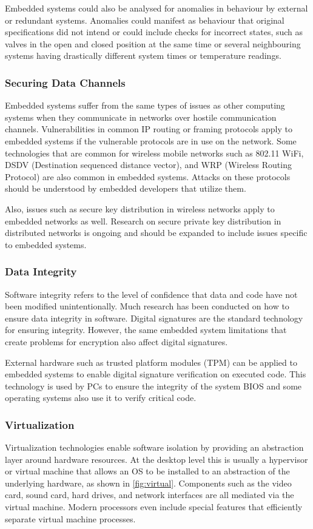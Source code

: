 \documentclass[final,conference,11pt]{IEEEtran}
\begin{document}
Embedded systems could also be analysed for anomalies in behaviour by external or redundant systems.  Anomalies could manifest as behaviour that original specifications did not intend or could include checks for incorrect states, such as valves in the open and closed position at the same time or several neighbouring systems having drastically different system times or temperature readings. \cite{Bondavalli2013} 

\subsubsection{Securing Data Channels}
Embedded systems suffer from the same types of issues as other computing systems when they communicate in networks over hostile communication channels.  Vulnerabilities in common IP routing or framing protocols apply to embedded systems if the vulnerable protocols are in use on the network.  Some technologies that are common for wireless mobile networks such as 802.11 WiFi, DSDV (Destination sequenced distance vector), and WRP (Wireless Routing Protocol) are also common in embedded systems. Attacks on these protocols should be understood by embedded developers that utilize them.  \cite{Kotha2012,edselc.2-52.0-7995199368320100101}

Also, issues such as secure key distribution in wireless networks apply to embedded networks as well.  Research on secure private key distribution in distributed networks is ongoing and should be expanded to include issues specific to embedded systems.

\subsubsection{Data Integrity}
Software integrity refers to the level of confidence that data and code have not been modified unintentionally.  Much research has been conducted on how to ensure data integrity in software.  Digital signatures are the standard technology for ensuring integrity. However, the same embedded system limitations that create problems for encryption also affect digital signatures.  \cite{Jaglan2011}

External hardware such as trusted platform modules (TPM) can be applied to embedded systems to enable digital signature verification on executed code.  This technology is used by PCs to ensure the integrity of the system BIOS and some operating systems also use it to verify critical code.  

\subsubsection{Virtualization}
Virtualization technologies enable software isolation by providing an abstraction layer around hardware resources.  At the desktop level this is usually a hypervisor or virtual machine that allows an OS to be installed to an abstraction of the underlying hardware, as shown in \figurename \ref{fig:virtual}.  Components such as the video card, sound card, hard drives, and network interfaces are all mediated via the virtual machine.  Modern processors even include special features that efficiently separate virtual machine processes. \cite{S1383762110000822n.d.}
\end{document}
